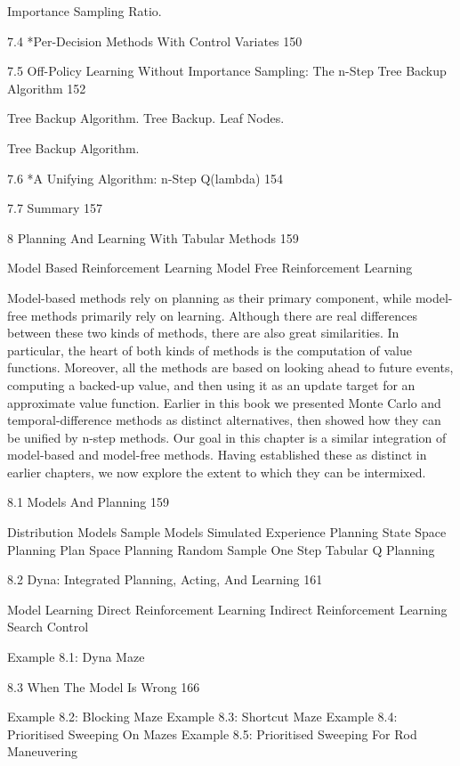 Importance Sampling Ratio.

7.4 *Per-Decision Methods With Control Variates 150



7.5 Off-Policy Learning Without Importance Sampling: The n-Step Tree Backup Algorithm 152

Tree Backup Algorithm. Tree Backup. Leaf Nodes.

Tree Backup Algorithm.

7.6 *A Unifying Algorithm: n-Step Q(lambda) 154



7.7 Summary 157



8 Planning And Learning With Tabular Methods 159

Model Based Reinforcement Learning
Model Free Reinforcement Learning

Model-based methods rely on planning as their primary component, while model-free methods primarily rely on learning. Although there are real differences between these two kinds of methods, there are also great similarities. In particular, the heart of both kinds of methods is the computation of value functions. Moreover, all the methods are based on looking ahead to future events, computing a backed-up value, and then using it as an update target for an approximate value function. Earlier in this book we presented Monte Carlo and temporal-difference methods as distinct alternatives, then showed how they can be unified by n-step methods. Our goal in this chapter is a similar integration of model-based and model-free methods. Having established these as distinct in earlier chapters, we now explore the extent to which they can be intermixed.

8.1 Models And Planning 159

Distribution Models
Sample Models
Simulated Experience
Planning
State Space Planning
Plan Space Planning
Random Sample One Step Tabular Q Planning

8.2 Dyna: Integrated Planning, Acting, And Learning 161

Model Learning
Direct Reinforcement Learning
Indirect Reinforcement Learning
Search Control

Example 8.1: Dyna Maze

8.3 When The Model Is Wrong 166

Example 8.2: Blocking Maze
Example 8.3: Shortcut Maze
Example 8.4: Prioritised Sweeping On Mazes
Example 8.5: Prioritised Sweeping For Rod Maneuvering

